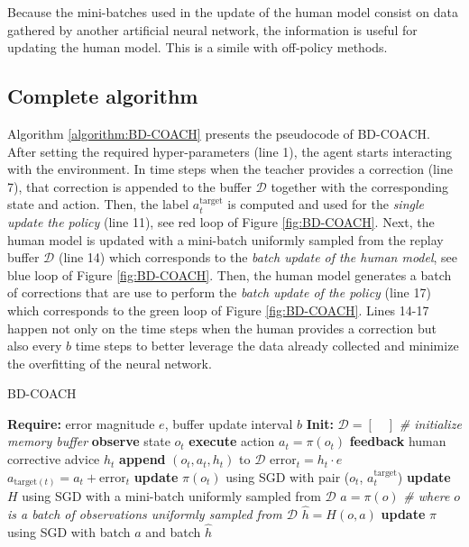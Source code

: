 Because the mini-batches used in the update of the human model consist on data gathered by another artificial neural network, the information is useful for updating the human model. This is a simile with off-policy methods.



\subsection*{Complete algorithm}


Algorithm \ref{algorithm:BD-COACH} presents the pseudocode of BD-COACH. After setting the required  hyper-parameters  (line 1), the agent starts interacting with the environment. In time steps when the teacher provides a correction (line 7), that correction is appended to the buffer $\mathcal{D}$ together with the corresponding state and action. Then, the label $a^{\text{target}}_{t}$ is computed and used for the \textit{single update the policy} (line 11), see red loop of Figure \ref{fig:BD-COACH}. Next, the human model is updated with a mini-batch uniformly sampled from the replay buffer $\mathcal{D}$ (line 14) which corresponds to the \textit{batch update of the human model}, see blue loop of Figure \ref{fig:BD-COACH}. Then, the human model generates a batch of corrections that are use to perform the \textit{batch update of the policy} (line 17) which corresponds to the green loop of Figure \ref{fig:BD-COACH}. Lines 14-17 happen not only on the time steps when the human provides a correction but also every $b$ time steps to better leverage the data already collected and minimize the overfitting of the neural network.



\begin{algorithm}[H]
\caption{BD-COACH}\label{algorithm:BD-COACH}
\begin{algorithmic}[1]
\State \textbf{Require:} error magnitude $e$, buffer update interval $b$
\State \textbf{Init:} $\mathcal{D} = [\quad]$  \emph{\# initialize memory buffer}
\State \textbf{observe} state $o_{t}$
\State \textbf{execute} action $a_{t}=\pi(o_{t})$
\State \textbf{feedback} human corrective advice $h_{t}$
\State \textbf{append} $(o_{t}, a_{t}, h_{t})$ to $\mathcal{D}$
\State $\text{error}_{t} = h_{t}\cdot e$
\State $a_{\text{target}(t)} = a_{t} + \text{error}_{t}$
\State \textbf{update} $\pi(o_{t})$ using SGD with pair ($o_{t}$, $a^{\text{target}}_{t}$)
\EndIf
{}
\State \textbf{update} $H$ using SGD with a mini-batch uniformly sampled from $\mathcal{D}$
\State  $a=\pi(o)$ \emph{\# where $o$ is a batch of observations uniformly sampled from $\mathcal{D}$}
\State  $\hat{h}=H(o, a)$
\State \textbf{update} $\pi$ using SGD with batch $a$ and batch $\hat{h}$
\EndIf
\EndFor
\end{algorithmic}
\end{algorithm}












